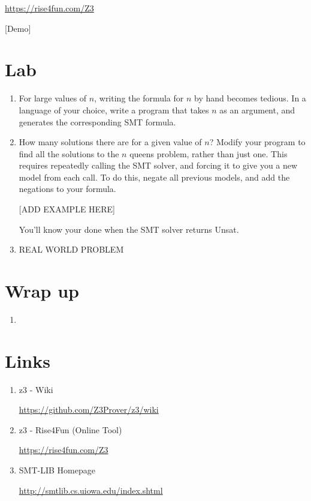 \documentclass{article}%
\begin{document}
	\url{https://rise4fun.com/Z3}

[Demo] 

\section{Lab}
\begin {enumerate}

	\item For large values of $n$, writing the formula for $n$ by hand becomes tedious.
	In a language of your choice, write a program that takes $n$ as an argument,
	and generates the corresponding SMT formula.

	\item How many solutions there are for a given value of $n$?
	Modify your program to find all the solutions to the $n$ queens problem, rather than just one.
	This requires repeatedly calling the SMT solver, and forcing it to give you a new model from each call.
	To do this, negate all previous models, and add the negations to your formula. 

	[ADD EXAMPLE HERE]

	You'll know your done when the SMT solver returns Unsat.

	\item [REAL WORLD PROBLEM]

\end {enumerate}

\section{Wrap up}

\begin {enumerate}

\item

\end {enumerate}

\section {Links}

\begin{enumerate}
	\item z3 - Wiki
	
	\url{https://github.com/Z3Prover/z3/wiki}

	\item z3 - Rise4Fun (Online Tool)
	
	\url{https://rise4fun.com/Z3}

	\item SMT-LIB Homepage
	
	\url{http://smtlib.cs.uiowa.edu/index.shtml}
\end{enumerate}
\end{document}

